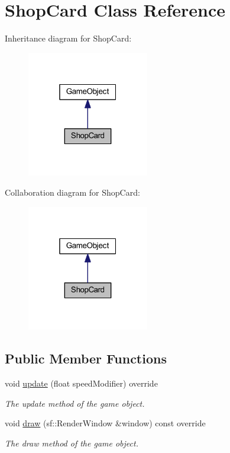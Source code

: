 \hypertarget{class_shop_card}{\section{Shop\+Card Class Reference}
\label{class_shop_card}
}


Inheritance diagram for Shop\+Card\+:\nopagebreak
\begin{figure}[H]
\begin{center}
\leavevmode
\includegraphics[width=151pt]{class_shop_card__inherit__graph}
\end{center}
\end{figure}


Collaboration diagram for Shop\+Card\+:\nopagebreak
\begin{figure}[H]
\begin{center}
\leavevmode
\includegraphics[width=151pt]{class_shop_card__coll__graph}
\end{center}
\end{figure}
\subsection*{Public Member Functions}
\begin{DoxyCompactItemize}
\item 
void \hyperlink{class_shop_card_a3f71274bdfc6c739969439975a3f0711}{update} (float speed\+Modifier) override
\begin{DoxyCompactList}\small\item\em The update method of the game object. \end{DoxyCompactList}\item 
void \hyperlink{class_shop_card_a8ff8f3f75dbdc8c44b93950e538f80e6}{draw} (sf\+::\+Render\+Window \&window) const override
\begin{DoxyCompactList}\small\item\em The draw method of the game object. \end{DoxyCompactList}\end{DoxyCompactItemize}
